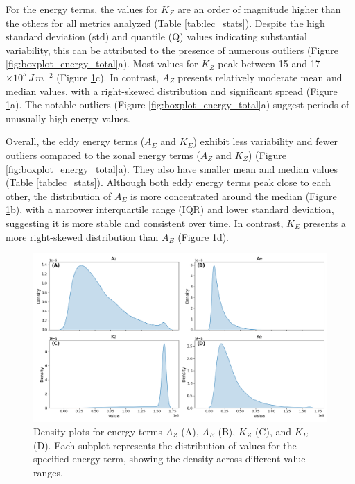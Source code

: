 For the energy terms, the values for $K_Z$ are an order of magnitude higher than the others for all metrics analyzed (Table \ref{tab:lec_stats}). Despite the high standard deviation (std) and quantile (Q) values indicating substantial variability, this can be attributed to the presence of numerous outliers (Figure \ref{fig:boxplot_energy_total}a). Most values for $K_Z$ peak between 15 and 17 $\times 10^5 \, J \, m^{-2}$ (Figure \ref{fig:ridge_plot_Energy_Terms_total}c). In contrast, $A_Z$ presents relatively moderate mean and median values, with a right-skewed distribution and significant spread (Figure \ref{fig:ridge_plot_Energy_Terms_total}a). The notable outliers (Figure \ref{fig:boxplot_energy_total}a) suggest periods of unusually high energy values.

Overall, the eddy energy terms ($A_E$ and $K_E$) exhibit less variability and fewer outliers compared to the zonal energy terms ($A_Z$ and $K_Z$) (Figure \ref{fig:boxplot_energy_total}a). They also have smaller mean and median values (Table \ref{tab:lec_stats}). Although both eddy energy terms peak close to each other, the distribution of $A_E$ is more concentrated around the median (Figure \ref{fig:ridge_plot_Energy_Terms_total}b), with a narrower interquartile range (IQR) and lower standard deviation, suggesting it is more stable and consistent over time. In contrast, $K_E$ presents a more right-skewed distribution than $A_E$ (Figure \ref{fig:ridge_plot_Energy_Terms_total}d).


\begin{figure}[!htbp]
\centering
\includegraphics[width=32pc]{figs_5/ridge_plot_Energy_Terms_total.png}
\caption[Density Plots - Energy Terms]{Density plots for energy terms $A_Z$ (A), $A_E$ (B), $K_Z$ (C), and $K_E$ (D). Each subplot represents the distribution of values for the specified energy term, showing the density across different value ranges.}
\label{fig:ridge_plot_Energy_Terms_total}
\end{figure}


